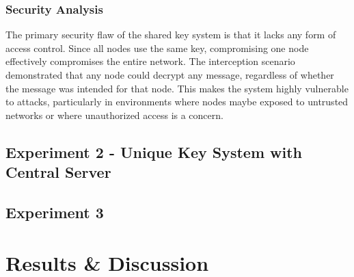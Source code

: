 \documentclass[journal]{IEEEtran}
\begin{document}
\subsubsection{Security Analysis} %
The primary security flaw of the shared key system is that it lacks any form of access control. Since all nodes use the same key, compromising one node effectively compromises the entire network. The interception scenario demonstrated that any node could decrypt any message, regardless of whether the message was intended for that node. This makes the system highly vulnerable to attacks, particularly in environments where nodes maybe exposed to untrusted networks or where unauthorized access is a concern. 

\subsection{Experiment 2 - Unique Key System with Central Server}

\subsection{Experiment 3}

\section{Results \& Discussion}


\ifCLASSOPTIONcaptionsoff
  \newpage
\fi







\end{document}
